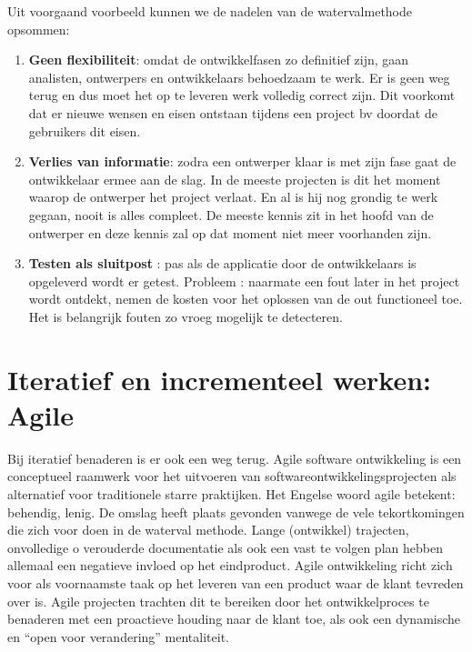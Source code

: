 Uit voorgaand voorbeeld kunnen we de nadelen van de watervalmethode opsommen:
\begin{enumerate}
	\item \textbf{Geen flexibiliteit}: omdat de ontwikkelfasen zo definitief zijn, gaan analisten, ontwerpers en ontwikkelaars behoedzaam te werk. Er is geen weg terug en dus moet het op te leveren werk volledig correct zijn. Dit voorkomt  dat er nieuwe wensen en eisen ontstaan tijdens een project bv doordat de gebruikers dit eisen. 
	\item \textbf{Verlies van informatie}: zodra een ontwerper klaar is met zijn fase gaat de ontwikkelaar ermee aan de slag. In de meeste projecten is dit het moment waarop de ontwerper het project verlaat. En al is hij nog grondig te werk gegaan, nooit is alles compleet. De meeste kennis zit in het hoofd van de ontwerper en deze kennis zal op dat moment niet meer voorhanden zijn.
	\item \textbf{Testen als sluitpost} : pas als de applicatie door de ontwikkelaars is opgeleverd wordt  er getest. Probleem : naarmate een fout later in het project wordt ontdekt, nemen de kosten voor het oplossen van de out functioneel toe. Het is belangrijk fouten zo vroeg mogelijk te detecteren. 
\end{enumerate}

\section{Iteratief en incrementeel werken: Agile}

Bij iteratief benaderen is er ook een weg terug. Agile software ontwikkeling is een conceptueel raamwerk voor het uitvoeren van softwareontwikkelingsprojecten als alternatief voor traditionele starre praktijken. Het Engelse woord agile betekent: behendig, lenig. De omslag heeft plaats gevonden vanwege de vele tekortkomingen die zich voor doen in de waterval methode. Lange (ontwikkel) trajecten, onvolledige o verouderde documentatie als ook een vast te volgen plan hebben allemaal een negatieve invloed op het eindproduct.
Agile ontwikkeling richt zich voor als voornaamste taak op het leveren van een product waar de klant tevreden over is. Agile projecten trachten dit te bereiken door het ontwikkelproces te benaderen met een proactieve houding naar de klant toe, als ook een dynamische en ``open voor verandering'' mentaliteit.

